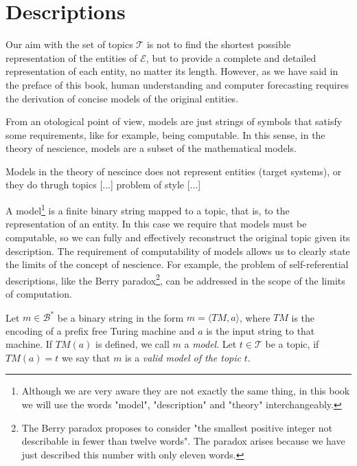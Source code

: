 %
%

\section{Descriptions}
\label{sec:descriptions_models}

Our aim with the set of topics $\mathcal{T}$ is not to find the shortest possible representation of the entities of $\mathcal{E}$, but to provide a complete and detailed representation of each entity, no matter its length. However, as we have said in the preface of this book, human understanding and computer forecasting requires the derivation of concise models of the original entities.

{\color{red} From an otological point of view, models are just strings of symbols that satisfy some requirements, like for example, being computable. In this sense, in the theory of nescience, models are a subset of the mathematical models.}

{\color{red} Models in the theory of nescince does not represent entities (target systems), or they do thrugh topics [...] problem of style [...] }

A model\footnote{Although we are very aware they are not exactly the same thing, in this book we will use the words "model", "description" and "theory" interchangeably.} is a finite binary string mapped to a topic, that is, to the representation of an entity. In this case we require that models must be computable, so we can fully and effectively reconstruct the original topic given its description. The requirement of computability of models allows us to clearly state the limits of the concept of nescience. For example, the problem of self-referential descriptions, like the Berry paradox\footnote{The Berry paradox proposes to consider "the smallest positive integer not describable in fewer than twelve words". The paradox arises because we have just described this number with only eleven words.}, can be addressed in the scope of the limits of computation.

\begin{definition} [Model]
\label{def:descriptions_model}
Let $m \in \mathcal{B}^\ast$ be a binary string in the form $m = \langle TM,a \rangle$, where $TM$ is the encoding of a prefix free Turing machine and $a$ is the input string to that machine. If $TM(a)$ is defined, we call $m$ a \emph{model}. Let $t \in \mathcal{T}$ be a topic, if $TM(a) = t$ we say that $m$ is a \emph{valid model of the topic} $t$.
\end{definition}

